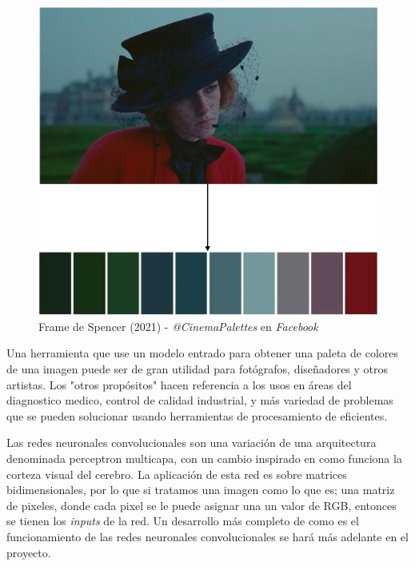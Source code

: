 \documentclass[14pt,a4paper]{report}
\begin{document}
 \begin{figure}[h]
  \centering
  \includegraphics[scale=0.5]{../cinema-pallete.png} 
  \caption{Frame de Spencer (2021) - \textit{@CinemaPalettes} en \textit{Facebook}}
  \label{fig:neural-network}
\end{figure}

Una herramienta que use un modelo entrado para obtener una paleta de colores de una imagen puede ser de gran utilidad para fotógrafos, diseñadores y otros artistas. Los "otros propósitos" hacen referencia a los usos en áreas del diagnostico medico, control de calidad industrial, y más variedad de problemas que se pueden solucionar usando herramientas de procesamiento de  eficientes.

Las redes neuronales convolucionales son una variación de una arquitectura denominada perceptron multicapa, con un cambio inspirado en como funciona la corteza visual del cerebro. La aplicación de esta red es sobre matrices bidimensionales, por lo que si tratamos una imagen como lo que es; una matriz de pixeles, donde cada pixel se le puede asignar una un valor de RGB, entonces se tienen los \textit{inputs} de la red. Un desarrollo más completo de como es el funcionamiento de las redes neuronales convolucionales se hará más adelante en el proyecto.
\end{document}
